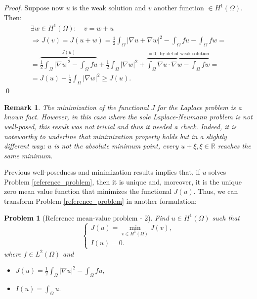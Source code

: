 \documentclass[a4paper,11pt]{article}
\newtheorem{problem}{Problem}
\newtheorem*{remark}{Remark}
\begin{document}
\begin{proof}
     \noindent Suppose now $u$ is the weak solution and $v$ another function $\in H^1(\Omega)$. Then:
     \begin{equation*}
     \begin{gathered}
     \exists w \in H^1(\Omega): \quad v = w+u \\
     \Rightarrow J(v)=J(u+w)= \frac{1}{2}\int_{\Omega}|\nabla u + \nabla w|^2 - \int_{\Omega}{fu}- \int_{\Omega}{fw} = \\
     = \overbrace{\frac{1}{2}\int_{\Omega}|\nabla u|^2 - \int_{\Omega}{fu}}^{J(u)} + \frac{1}{2}\int_{\Omega}|\nabla w|^2 + \overbrace{\int_{\Omega}\nabla u \cdot \nabla w - \int_{\Omega}{fw}}^{=0, \text { by def of weak solution}} =\\
     = J(u) + \frac{1}{2}\int_{\Omega}|\nabla w| ^2 \geq J(u).
     \end{gathered}
     \end{equation*}
     \qed
\end{proof}

\begin{remark}
	The minimization of the functional $J$ for the Laplace problem is a known fact. However, in this case where the sole Laplace-Neumann problem is not well-posed, this result was not trivial and thus it needed a check. Indeed, it is noteworthy to underline that minimization property holds but in a slightly different way: $u$ is not the absolute minimum point, every $u+\xi, \xi\in\mathbb{R}$ reaches the same minimum.
\end{remark}\vspace{4mm}

\noindent Previous well-posedness and minimization results implies that, if $u$ solves Problem \ref{reference_problem}, then it is unique and, moreover, it is the unique zero mean value function that minimizes the functional $J(u)$. Thus, we can transform Problem \ref{reference_problem} in another formulation:\\

\begin{problem}[Reference mean-value problem - 2] \label{reference_problem_2} Find $u\in H^1(\Omega)$ such that
	\begin{equation*}
	\begin{cases}
	J(u)=\displaystyle \min_{v\in H^1(\Omega)} J(v),\\
	I(u) = 0.
	\end{cases}
	\end{equation*}
 where $f\in L^2(\Omega)$ and  \vspace{2mm}
	\begin{itemize}
		\item $J(u) = \frac{1}{2}\int_{\Omega} |\nabla u |^2 - \int_{\Omega}fu,$
		\item $I(u) = \int_{\Omega} u. $
	\end{itemize}
\end{problem}\vspace{3mm}
\end{document}
